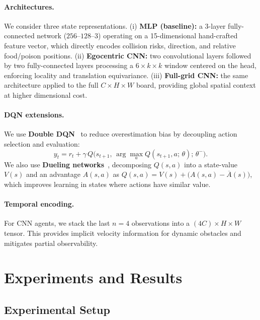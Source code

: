 \documentclass[runningheads]{llncs}
\begin{document}
\paragraph{Architectures.}
We consider three state representations.
(i) \textbf{MLP (baseline):} a 3-layer fully-connected network
($256$--$128$--$3$) operating on a 15-dimensional hand-crafted feature vector,
which directly encodes collision risks, direction, and relative food/poison
positions.
(ii) \textbf{Egocentric CNN:} two convolutional layers followed by two
fully-connected layers processing a $6 \times k \times k$ window centered on
the head, enforcing locality and translation equivariance.
(iii) \textbf{Full-grid CNN:} the same architecture applied to the full
$C \times H \times W$ board, providing global spatial context at higher
dimensional cost.

\paragraph{DQN extensions.}
We use \textbf{Double DQN}~\cite{van2016deep} to reduce overestimation bias by decoupling action
selection and evaluation:
\begin{equation}
  y_t = r_t + \gamma\, Q\bigl(s_{t+1},\,\arg\max_a Q(s_{t+1}, a;\,\theta);\,\theta^-\bigr).
\end{equation}
We also use \textbf{Dueling networks}~\cite{wang2016dueling}, decomposing $Q(s,a)$ into a state-value
$V(s)$ and an advantage $A(s,a)$ as
$Q(s,a) = V(s) + \bigl(A(s,a) - \overline{A}(s)\bigr)$, which improves learning
in states where actions have similar value.

\paragraph{Temporal encoding.}
For CNN agents, we stack the last $n=4$ observations into a
$(4C) \times H \times W$ tensor. This provides implicit velocity information
for dynamic obstacles and mitigates partial observability.

\section{Experiments and Results}
\label{sec:exp}

\subsection{Experimental Setup}
\label{sec:setup}
\end{document}

